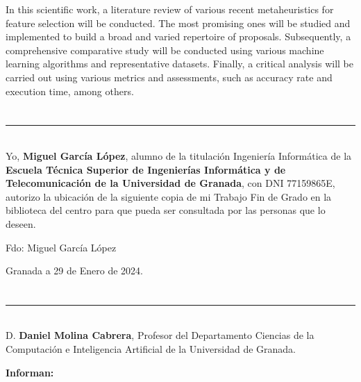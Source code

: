In this scientific work, a literature review of various recent metaheuristics for feature selection will be conducted. The most promising ones will be studied and implemented to build a broad and varied repertoire of proposals. Subsequently, a comprehensive comparative study will be conducted using various machine learning algorithms and representative datasets. Finally, a critical analysis will be carried out using various metrics and assessments, such as accuracy rate and execution time, among others.\\[6pt]

\chapter*{}
\thispagestyle{empty}

\noindent\rule[-1ex]{\textwidth}{2pt}\\[4.5ex]

Yo, \textbf{Miguel García López}, alumno de la titulación Ingeniería Informática de la \textbf{Escuela Técnica Superior
       de Ingenierías Informática y de Telecomunicación de la Universidad de Granada}, con DNI 77159865E, autorizo la
ubicación de la siguiente copia de mi Trabajo Fin de Grado en la biblioteca del centro para que pueda ser
consultada por las personas que lo deseen.

\vspace{6cm}

\noindent Fdo: Miguel García López

\vspace{2cm}

\begin{flushright}
       Granada a 29 de Enero de 2024.
\end{flushright}


\chapter*{}
\thispagestyle{empty}

\noindent\rule[-1ex]{\textwidth}{2pt}\\[4.5ex]

D. \textbf{Daniel Molina Cabrera}, Profesor del Departamento Ciencias de la Computación e Inteligencia Artificial de la Universidad de Granada.

\vspace{0.5cm}
\textbf{Informan:}

\vspace{0.5cm}

